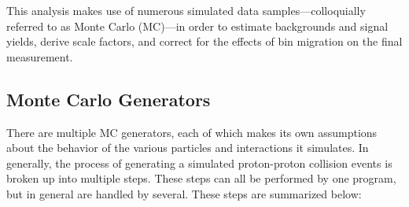 This analysis makes use of numerous simulated data samples---colloquially
referred to as Monte Carlo (MC)---in order to estimate backgrounds and signal
yields, derive scale factors, and correct for the effects of bin migration on
the final measurement.

\subsection{Monte Carlo Generators}
\label{ssec:mc_generators}

There are multiple MC generators, each of which makes its own assumptions about
the behavior of the various particles and interactions it simulates. In
generally, the process of generating a simulated proton-proton collision
events is broken up into multiple steps. These steps can all be performed by one
program, but in general are handled by several. These steps are summarized
below:

